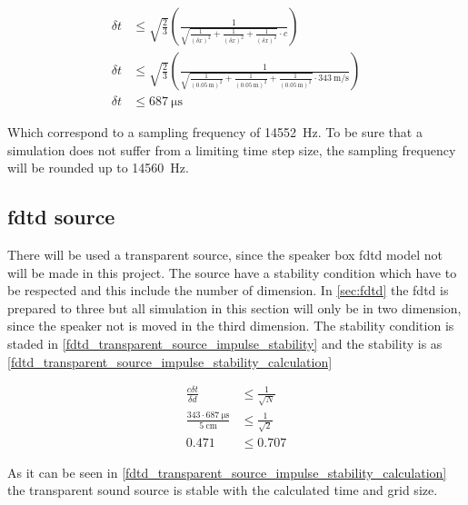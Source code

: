  
    \begin{subequations}\label{fdtd_time_stepsize_con_one}
\begin{alignat}{2}
\delta t &\leq \sqrt{\frac{2}{3}}  \left( \frac{1}{\sqrt{\frac{1}{(\delta x)^2}+\frac{1}{(\delta x)^2}+\frac{1}{(\delta x)^2} }\cdot c} \right)\\
\delta t &\leq \sqrt{\frac{2}{3}}  \left( \frac{1}{\sqrt{\frac{1}{(\SI{0.05}{\meter})^2}+\frac{1}{(\SI{0.05}{\meter})^2}+\frac{1}{(\SI{0.05}{\meter})^2} }\cdot \SI{343}{\meter\per\second}} \right)\\
\delta t &\leq \SI{687}{\micro\second} 
\end{alignat}
\end{subequations}
    
 Which correspond to a sampling frequency of \SI{14552}{\hertz}. To be sure that a simulation does not suffer from a limiting time step size, the sampling frequency will be rounded up to \SI{14560}{\hertz}.
 
 

\subsection{\gls{fdtd} source}
There will be used a transparent source, since the speaker box \gls{fdtd} model not will be made in this project. The source have a stability condition which have to be respected and this include the number of dimension. In \autoref{sec:fdtd} the \gls{fdtd} is prepared to three but all simulation in this section will only be in two dimension, since the speaker not is moved in the third dimension.  The stability condition is staded in \autoref{fdtd_transparent_source_impulse_stability} and the stability is as \autoref{fdtd_transparent_source_impulse_stability_calculation}



\begin{subequations}\label{fdtd_transparent_source_impulse_stability_calculation}
\begin{alignat}{2}
\frac{c \delta t}{\delta d} &\leq \frac{1}{\sqrt{N}}\\
\frac{343 \cdot \SI{687}{\micro\second}}{\SI{5}{\centi\meter}} &\leq \frac{1}{\sqrt{2}}\\
0.471 &\leq 0.707
\end{alignat}
\end{subequations}

As it can be seen in \autoref{fdtd_transparent_source_impulse_stability_calculation} the transparent sound source is stable with the calculated time and grid size.

